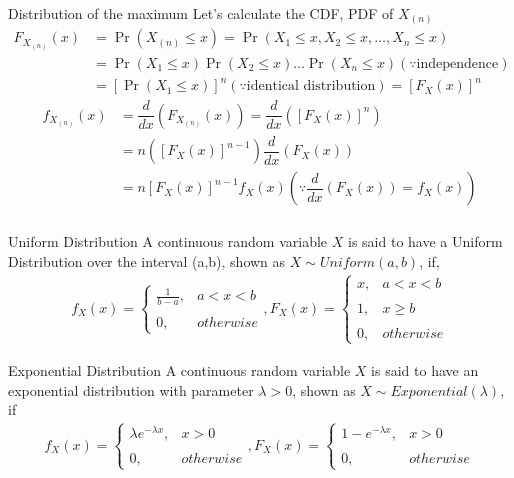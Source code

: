 \documentclass{beamer}
\providecommand{\sbrak}[1]{\ensuremath{{}\left[#1\right]}}
\providecommand{\pr}[1]{\ensuremath{\Pr\left(#1\right)}}
\providecommand{\brak}[1]{\ensuremath{\left(#1\right)}}
\begin{document}
\begin{frame}
\frametitle{}
\begin{block}{Distribution of the maximum}
Let's calculate the CDF, PDF of $X_{(n)}$
\begin{align}
   F_{X_{(n)}}(x)&=\pr{X_{(n)}\leq x}=\pr{X_{1}\leq x,X_{2}\leq x,\dots,X_{n}\leq x}\\
   &=\pr{X_{1}\leq x}\pr{X_{2}\leq x}\dots\pr{X_{n}\leq x}\brak{\because \text{independence}}\\
   \label{eq:F}
   &=\sbrak{\pr{X_{1}\leq x}}^{n}\brak{\because \text{identical distribution}}=\sbrak{F_{X}(x)}^{n}
\end{align}
\begin{align}
   f_{X_{(n)}}(x)&=\dfrac{d}{dx}\brak{F_{X_{(n)}}(x)}=\dfrac{d}{dx}\brak{\sbrak{F_{X}(x)}^{n}}\\
   &=n\brak{\sbrak{F_{X}(x)}^{n-1}}\dfrac{d}{dx}\brak{F_{X}(x)}\\
   \label{eq:f}
   &=n\sbrak{F_{X}(x)}^{n-1}f_{X}(x)\brak{\because\dfrac{d}{dx}\brak{F_{X}(x)}=f_{X}(x)}
\end{align}
\end{block}
\end{frame}

\begin{frame}
\frametitle{}
\begin{block}{Uniform Distribution}
A continuous random variable $X$ is said to have a Uniform Distribution over the interval (a,b), shown as $X\sim Uniform(a,b)$, if,
\begin{align}
        f_{X}(x)=\begin{cases}
	\frac{1}{b-a}, & a< x<b \\~\\[-1em]
	0, & otherwise
	\end{cases},F_{X}(x)=\begin{cases}
	x, & a< x<b \\~\\[-1em]
	1, & x\geq b\\~\\[-1em]
	0, & otherwise
	\end{cases} 
\end{align}
\end{block}
\begin{block}{Exponential Distribution}
A continuous random variable $X$ is said to have an exponential distribution with parameter $\lambda>0$, shown as $X\sim Exponential(\lambda)$, if 
\begin{align}
        f_{X}(x)=\begin{cases}
	\lambda e^{-\lambda x}, & x>0\\~\\[-1em]
	0, & otherwise
	\end{cases},F_{X}(x)=\begin{cases}
	1-e^{-\lambda x}, & x>0 \\~\\[-1em]
	0, & otherwise
	\end{cases} 
\end{align}
\end{block}
\end{frame}
\end{document}

